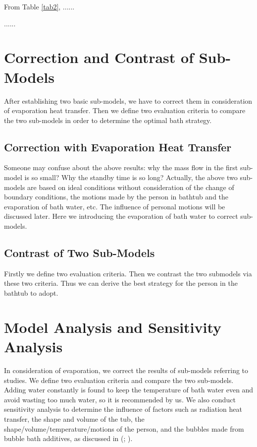 \documentclass{mcmthesis}
\begin{document}
From Table \ref{tab2}, ......

......

\section{Correction and Contrast of Sub-Models}

After establishing two basic sub-models, we have to correct them in consideration 
of evaporation heat transfer. Then we define two evaluation criteria to compare 
the two sub-models in order to determine the optimal bath strategy.

\subsection{Correction with Evaporation Heat Transfer}

Someone may confuse about the above results: why the mass flow in the first 
sub-model is so small? Why the standby time is so long? Actually, the above two 
sub-models are based on ideal conditions without consideration of the change of 
boundary conditions, the motions made by the person in bathtub and the 
evaporation of bath water, etc. The influence of personal motions will be 
discussed later. Here we introducing the evaporation of bath water to correct 
sub-models.

\subsection{Contrast of Two Sub-Models}

Firstly we define two evaluation criteria. Then we contrast the two submodels 
via these two criteria. Thus we can derive the best strategy for the person in 
the bathtub to adopt.

\section{Model Analysis and Sensitivity Analysis}

In consideration of evaporation, we correct the results of sub-models referring 
to studies. We define two evaluation criteria 
and compare the two sub-models. Adding water constantly is found to keep the 
temperature of bath water even and avoid wasting too much water, so it is 
recommended by us. We also conduct sensitivity analysis to determine the 
influence of factors such as radiation heat transfer, the shape and volume of 
the tub, the shape/volume/temperature/motions of the person, and the bubbles 
made from bubble bath additives, as discussed 
in (\cite{evaporation2018}; \cite{thesis2015}).
\end{document}
